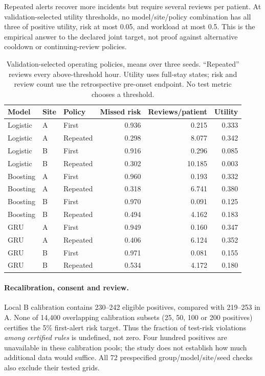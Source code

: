 Repeated alerts recover more incidents but require several reviews per patient. At validation-selected utility thresholds, no model/site/policy combination has all three of positive utility, risk at most 0.05, and workload at most 0.5. This is the empirical answer to the declared joint target, not proof against alternative cooldown or continuing-review policies.
\begin{table}[t]
\centering\small
\caption{Validation-selected operating policies, means over three seeds. ``Repeated'' reviews every above-threshold hour. Utility uses full-stay states; risk and review count use the retrospective pre-onset endpoint. No test metric chooses a threshold.}
\label{tab:policies}
\begin{tabular}{lllrrr}\toprule
Model & Site & Policy & Missed risk & Reviews/patient & Utility\\\midrule
Logistic & A & First & 0.936 & 0.215 & 0.333 \\
Logistic & A & Repeated & 0.298 & 8.077 & 0.342 \\
Logistic & B & First & 0.916 & 0.296 & 0.085 \\
Logistic & B & Repeated & 0.302 & 10.185 & 0.003 \\
Boosting & A & First & 0.960 & 0.193 & 0.332 \\
Boosting & A & Repeated & 0.318 & 6.741 & 0.380 \\
Boosting & B & First & 0.970 & 0.091 & 0.125 \\
Boosting & B & Repeated & 0.494 & 4.162 & 0.183 \\
GRU & A & First & 0.949 & 0.160 & 0.347 \\
GRU & A & Repeated & 0.406 & 6.124 & 0.352 \\
GRU & B & First & 0.971 & 0.081 & 0.155 \\
GRU & B & Repeated & 0.534 & 4.172 & 0.180 \\
\bottomrule\end{tabular}\end{table}

\paragraph{Recalibration, consent and review.}
Local B calibration contains 230--242 eligible positives, compared with 219--253 in A. None of 14,400 overlapping calibration subsets (25, 50, 100 or 200 positives) certifies the 5\% first-alert risk target. Thus the fraction of test-risk violations \emph{among certified rules} is undefined, not zero. Four hundred positives are unavailable in these calibration pools; the study does not establish how much additional data would suffice. All 72 prespecified group/model/site/seed checks also exclude their tested grids.

